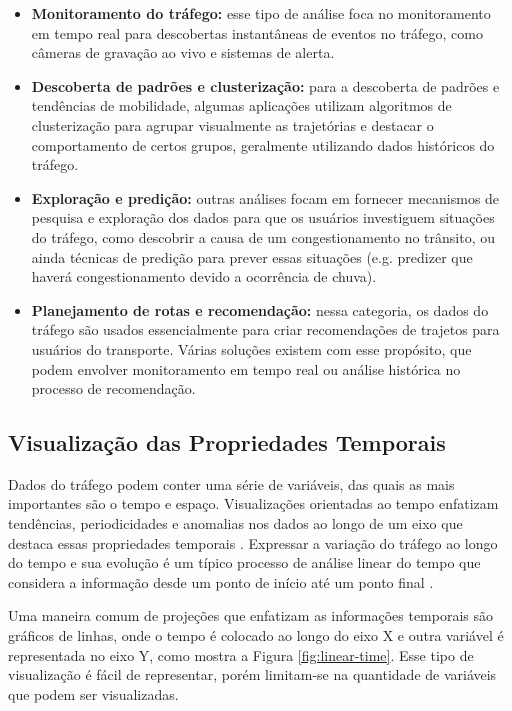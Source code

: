 \begin{itemize}
  \item \textbf{Monitoramento do tráfego:} esse tipo de análise foca no
monitoramento em tempo real para descobertas instantâneas de eventos no tráfego,
como câmeras de gravação ao vivo e sistemas de alerta.

  \item \textbf{Descoberta de padrões e clusterização:} para a descoberta de
padrões e tendências de mobilidade, algumas aplicações utilizam algoritmos
de clusterização para agrupar visualmente as trajetórias e destacar
o comportamento de certos grupos, geralmente utilizando dados históricos
do tráfego.

  \item \textbf{Exploração e predição:} outras análises focam em fornecer
mecanismos de pesquisa e exploração dos dados para que os usuários investiguem
situações do tráfego, como descobrir a causa de um congestionamento no trânsito,
ou ainda técnicas de predição para prever essas situações (e.g. predizer que
haverá congestionamento devido a ocorrência de chuva).

  \item \textbf{Planejamento de rotas e recomendação:} nessa categoria, 
os dados do tráfego são usados essencialmente para criar recomendações de trajetos para usuários
do transporte. Várias soluções existem com esse propósito, que podem envolver
monitoramento em tempo real ou análise histórica no processo de recomendação.
\end{itemize}

\subsection{Visualização das Propriedades Temporais}

Dados do tráfego podem conter uma série de variáveis, das quais as mais
importantes são o tempo e espaço. Visualizações orientadas ao tempo enfatizam
tendências, periodicidades e anomalias nos dados ao longo de um eixo que destaca
essas propriedades temporais \citep{Aigner2008}. Expressar a variação do tráfego
ao longo do tempo e sua evolução é um típico processo de análise linear do
tempo que considera a informação desde um ponto de início até um ponto final
\citep{Chen2015}. 

Uma maneira comum de projeções que enfatizam as informações temporais
são gráficos de linhas, onde o tempo é colocado ao longo do eixo X e outra variável
é representada no eixo Y, como mostra a Figura \ref{fig:linear-time}. Esse tipo
de visualização é fácil de representar, porém limitam-se na quantidade de
variáveis que podem ser visualizadas.


